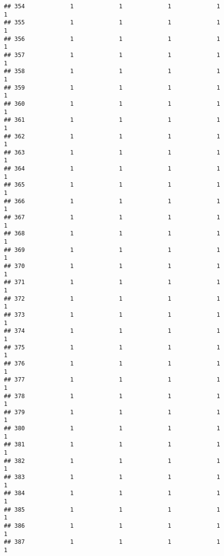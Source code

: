 \documentclass[
]{article}
\begin{document}
\begin{verbatim}
## 354             1             1             1             1             1
## 355             1             1             1             1             1
## 356             1             1             1             1             1
## 357             1             1             1             1             1
## 358             1             1             1             1             1
## 359             1             1             1             1             1
## 360             1             1             1             1             1
## 361             1             1             1             1             1
## 362             1             1             1             1             1
## 363             1             1             1             1             1
## 364             1             1             1             1             1
## 365             1             1             1             1             1
## 366             1             1             1             1             1
## 367             1             1             1             1             1
## 368             1             1             1             1             1
## 369             1             1             1             1             1
## 370             1             1             1             1             1
## 371             1             1             1             1             1
## 372             1             1             1             1             1
## 373             1             1             1             1             1
## 374             1             1             1             1             1
## 375             1             1             1             1             1
## 376             1             1             1             1             1
## 377             1             1             1             1             1
## 378             1             1             1             1             1
## 379             1             1             1             1             1
## 380             1             1             1             1             1
## 381             1             1             1             1             1
## 382             1             1             1             1             1
## 383             1             1             1             1             1
## 384             1             1             1             1             1
## 385             1             1             1             1             1
## 386             1             1             1             1             1
## 387             1             1             1             1             1

\end{verbatim}
\end{document}
